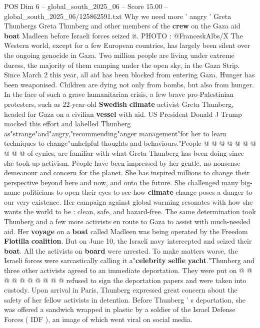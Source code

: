 \begin{textsample}{POS Dim 6 – global\_south\_2025\_06 – Score 15.00 – global\_south\_2025\_06/125862591.txt}  \label{ex:f6_pos_011}
Why we need more ' angry ' Greta Thunbergs Greta Thunberg and other members of the \textbf{crew} on the Gaza aid \textbf{boat} Madleen before Israeli forces seized it.
PHOTO : @FranceskAlbs/X The Western world, except for a few European countries, has largely been silent over the ongoing genocide in Gaza.
Two million people are living under extreme duress, the majority of them camping under the open sky, in the Gaza Strip.
Since March 2 this year, all aid has been blocked from entering Gaza.
Hunger has been weaponised.
Children are dying not only from bombs, but also from hunger.
In the face of such a grave humanitarian crisis, a few brave pro-Palestinian protesters, such as 22-year-old \textbf{Swedish} \textbf{climate} activist Greta Thunberg, headed for Gaza on a civilian \textbf{vessel} with aid.
US President Donald J Trump mocked this effort and labelled Thunberg as"strange"and"angry,"recommending"anger management"for her to learn techniques to change"unhelpful thoughts and behaviours."People @ @ @ @ @ @ @ @ @ @ of cynics, are familiar with what Greta Thunberg has been doing since she took up activism.
People have been impressed by her gentle, no-nonsense demeanour and concern for the planet.
She has inspired millions to change their perspective beyond here and now, and onto the future.
She challenged many big-name politicians to open their eyes to see how \textbf{climate} change poses a danger to our very existence.
Her campaign against global warming resonates with how she wants the world to be : clean, safe, and hazard-free.
The same determination took Thunberg and a few more activists en route to Gaza to assist with much-needed aid.
Her \textbf{voyage} on a \textbf{boat} called Madleen was being operated by the Freedom \textbf{Flotilla} \textbf{coalition}.
But on June 10, the Israeli navy intercepted and seized their \textbf{boat}.
All the activists on \textbf{board} were arrested.
To make matters worse, the Israeli forces were sarcastically calling it a"\textbf{celebrity} \textbf{selfie} \textbf{yacht}."Thunberg and three other activists agreed to an immediate deportation.
They were put on @ @ @ @ @ @ @ @ @ @ refused to sign the deportation papers and were taken into custody.
Upon arrival in Paris, Thunberg expressed great concern about the safety of her fellow activists in detention.
Before Thunberg ' s deportation, she was offered a sandwich wrapped in plastic by a soldier of the Israel Defense Forces ( IDF ), an image of which went viral on social media.

\end{textsample}
